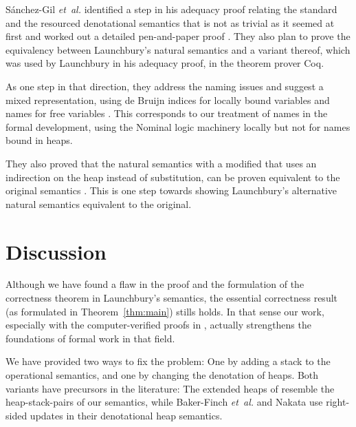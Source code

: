\documentclass[twopage]{scrartcl}
\theoremstyle{nonumberbreak}
\newcommand{\sRule}[1]{\text{{\textsc{#1}}}}
\newcommand{\shortcite}{\cite}
\begin{document}
S{\'a}nchez-Gil {\em et~al.} identified a step in his adequacy proof relating the standard and the resourced denotational semantics that is not as trivial as it seemed at first and worked out a detailed pen-and-paper proof \shortcite{functionspaces}. They also plan to prove the equivalency between Launchbury’s natural semantics and a variant thereof, which was used by Launchbury in his adequacy proof, in the theorem prover Coq.

As one step in that direction, they address the naming issues and suggest a mixed representation, using de Bruijn indices for locally bound variables and names for free variables \shortcite{nameless}. This corresponds to our treatment of names in the formal development, using the Nominal logic machinery \cite{nominal} locally but not for names bound in heaps.

They also proved that the natural semantics with a modified \sRule{App} that uses an indirection on the heap instead of substitution, can be proven equivalent to the original semantics \cite{indirections}. This is one step towards showing Launchbury's alternative natural semantics equivalent to the original.

\section{Discussion}

Although we have found a flaw in the proof and the formulation of the correctness theorem in Launchbury’s semantics, the essential correctness result (as formulated in Theorem~\ref{thm:main}) stills holds. In that sense our work, especially with the computer-verified proofs in \cite{afp}, actually strengthens the foundations of formal work in that field.

We have provided two ways to fix the problem: One by adding a stack to the operational semantics, and one by changing the denotation of heaps. Both variants have precursors in the literature: The extended heaps of \cite{distributed} resemble the heap-stack-pairs of our semantics, while Baker-Finch {\em et~al.} \shortcite{parallel} and Nakata \shortcite{nakata_blackhole} use right-sided updates in their denotational heap semantics.
\end{document}
